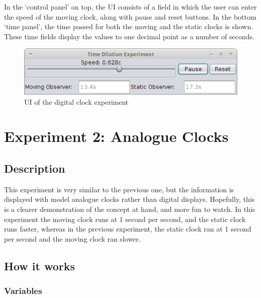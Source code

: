 \documentclass[11pt]{article}
\begin{document}
In the `control panel' on top, the UI consists of a field in which the user can enter the speed of the moving clock, along with pause and reset buttons.
In the bottom `time panel', the time passed for both the moving and the static clocks is shown. These time fields display the values to one decimal point as a number of seconds.
\begin{figure}[htb]
\centering
\includegraphics[width=.9\linewidth]{./DigitalUI.png}
\caption{UI of the digital clock experiment}
\end{figure}
\section*{Experiment 2: Analogue Clocks}
\label{sec-2}
\subsection*{Description}
\label{sec-2-1}

This experiment is very similar to the previous one, but the information is displayed with model analogue clocks rather than digital displays. Hopefully, this is a clearer demonstration of the concept at hand, and more fun to watch.
In this experiment the moving clock runs at 1 second per second, and the static clock runs faster, whereas in the previous experiment, the static clock ran at 1 second per second and the moving clock ran slower.
\subsection*{How it works}
\label{sec-2-2}
\subsubsection*{Variables}
\label{sec-2-2-1}
\end{document}

